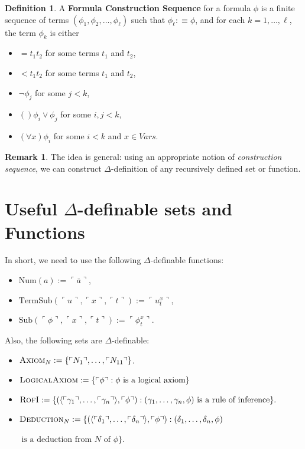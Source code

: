 \documentclass[11pt,letterpaper]{book}
\theoremstyle{definition}
\newtheorem{definition}{Definition}[section]
\newtheorem{remark}{Remark}[section]
\begin{document}
\begin{definition}
A \textbf{Formula Construction Sequence} for a formula $\phi$ is a finite sequence of terms $(\phi_1, \phi_2, \ldots, \phi_{\ell})$ such that $\phi_{\ell} : \equiv \phi$, and for each $k=1, \ldots, \ell$, the term $\phi_k$ is either
\begin{itemize}
\item{$= t_1 t_2$ for some terms $t_1$ and $t_2$,}
\item{$< t_1 t_2$ for some terms $t_1$ and $t_2$,}
\item{$\lnot \phi_j$ for some $j < k$,}
\item{$( ) \phi_i \lor \phi_j $ for some $i, j < k$,}
\item{$(\forall x) \phi_i $ for some $i < k$ and $x \in Vars$.}
\end{itemize}
\end{definition}

\begin{remark}
The idea is general: using an appropriate notion of \emph{construction sequence}, we can construct $\Delta$-definition of any recursively defined set or function.
\end{remark}

\section{Useful $\Delta$-definable sets and Functions}

In short, we need to use the following $\Delta$-definable functions:
\begin{itemize}
\item{$\text{Num}(a) := \ulcorner \overline{a} \urcorner$,}
\item{$\text{TermSub}( \ulcorner u \urcorner,  \ulcorner x \urcorner,  \ulcorner t \urcorner ) :=  \ulcorner u_t ^x \urcorner $,}
\item{$\text{Sub}(  \ulcorner \phi \urcorner,  \ulcorner x \urcorner,  \ulcorner t \urcorner ) :=  \ulcorner \phi_t ^x \urcorner $.}
\end{itemize}

Also, the following sets are $\Delta$-definable:
\begin{itemize}
\item{$\text{\textsc{Axiom}}_N := \{ \ulcorner N_1 \urcorner , \ldots,  \ulcorner N_{11} \urcorner \} $. }
\item{$\text{\textsc{LogicalAxiom}} := \{ \ulcorner \phi \urcorner: \phi \text{ is a logical axiom} \} $}
\item{$\text{\textsc{RofI}} := \{ ( \langle \ulcorner \gamma_1 \urcorner , \ldots, \ulcorner \gamma_n \urcorner \rangle , \ulcorner \phi \urcorner  ): (\gamma_1, \ldots, \gamma_n, \phi) \text{ is a rule of inference} \} . $}
\item{$\text{\textsc{Deduction}}_N := \{ ( \langle \ulcorner \delta_1 \urcorner , \ldots, \ulcorner \delta_n \urcorner \rangle , \ulcorner \phi \urcorner  ): (\delta_1, \ldots, \delta_n, \phi) $ 

$ \text{ is a deduction from $N$ of $\phi$}  \} $.
}
\end{itemize}
\end{document}

